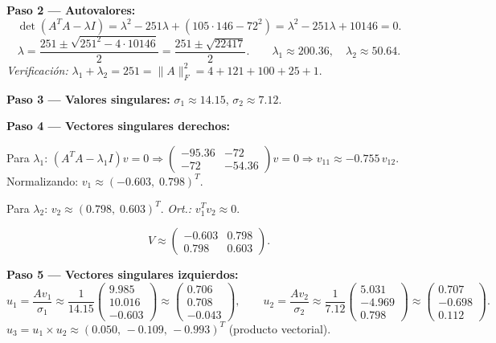 \documentclass[11pt,a4paper]{article}
\begin{document}
\textbf{Paso 2 --- Autovalores:}
\[
  \det(A^TA - \lambda I) = \lambda^2 - 251\lambda + (105\cdot146-72^2)
  = \lambda^2 - 251\lambda + 10146 = 0.
\]
\[
  \lambda = \frac{251 \pm \sqrt{251^2 - 4\cdot10146}}{2}
  = \frac{251 \pm \sqrt{22417}}{2}.
  \qquad \lambda_1 \approx 200.36,\quad \lambda_2 \approx 50.64.
\]
\textit{Verificación:} $\lambda_1+\lambda_2 = 251 = \|A\|_F^2 = 4+121+100+25+1$. \checkmark

\textbf{Paso 3 --- Valores singulares:}
$\sigma_1 \approx 14.15$, $\sigma_2 \approx 7.12$.

\textbf{Paso 4 --- Vectores singulares derechos:}

Para $\lambda_1$:
$(A^TA-\lambda_1 I)v=0
\Rightarrow \begin{pmatrix}-95.36&-72\\-72&-54.36\end{pmatrix}v=0
\Rightarrow v_{11} \approx -0.755\,v_{12}$.
Normalizando: $v_1 \approx (-0.603,\;0.798)^T$.

Para $\lambda_2$:
$v_2 \approx (0.798,\;0.603)^T$.
\textit{Ort.:} $v_1^Tv_2 \approx 0$. \checkmark

\[
  V \approx \begin{pmatrix}-0.603&0.798\\0.798&0.603\end{pmatrix}.
\]

\textbf{Paso 5 --- Vectores singulares izquierdos:}
\[
  u_1 = \frac{Av_1}{\sigma_1}
  \approx \frac{1}{14.15}\begin{pmatrix}9.985\\10.016\\-0.603\end{pmatrix}
  \approx \begin{pmatrix}0.706\\0.708\\-0.043\end{pmatrix},
  \qquad
  u_2 = \frac{Av_2}{\sigma_2}
  \approx \frac{1}{7.12}\begin{pmatrix}5.031\\-4.969\\0.798\end{pmatrix}
  \approx \begin{pmatrix}0.707\\-0.698\\0.112\end{pmatrix}.
\]
$u_3 = u_1\times u_2 \approx (0.050,\,-0.109,\,-0.993)^T$ (producto vectorial).
\end{document}
